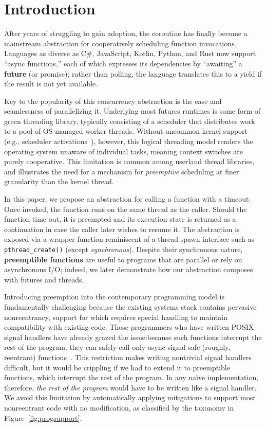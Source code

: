 \section{Introduction}
\label{sec:intro}

After years of struggling to gain adoption, the coroutine has finally become a
mainstream abstraction for cooperatively scheduling function invocations.  Languages
as diverse as C\#, JavaScript, Kotlin, Python, and Rust now support ``async
functions,'' each of which expresses its dependencies by ``awaiting'' a
\textbf{future} (or promise); rather than polling, the language translates this to a
yield if the result is not yet available.

Key to the popularity of this concurrency abstraction is the ease and seamlessness of
parallelizing it.  Underlying most futures runtimes is some form of green threading
library, typically consisting of a scheduler that distributes work to a pool of
OS-managed worker threads.  Without uncommon kernel
support (e.g., scheduler activations~\cite{anderson:sosp1991}), however, this logical
threading model renders the operating system unaware of individual tasks, meaning
context switches are purely cooperative.  This limitation is common among userland
thread libraries, and illustrates the need for a mechanism for \textit{preemptive}
scheduling at finer granularity than the kernel thread.

In this paper, we propose an abstraction for calling a function with a timeout:  Once
invoked, the function runs on the same thread as the caller.  Should the function
time out, it is preempted and its execution state is returned as a continuation in
case the caller later wishes to resume it.  The abstraction is exposed via a wrapper
function reminiscent of a thread spawn interface such as \texttt{pthread\_create()}
(except \textit{synchronous}).  Despite their synchronous nature, \textbf{preemptible
functions} are useful to programs that are parallel or rely on asynchronous I/O;
indeed, we later demonstrate how our abstraction composes with futures and threads.

Introducing preemption into the contemporary programming model is fundamentally
challenging because the existing systems stack contains pervasive nonreentrancy,
support for which requires special handling to maintain compatibility with existing
code.  Those programmers who have written POSIX signal handlers have already grazed
the issue:\@ because such functions interrupt the rest of the program, they can
safely call only async-signal-safe (roughly, reentrant)
functions~\cite{signal-safety-manpage}.  This restriction makes writing nontrivial
signal handlers difficult, but it would be crippling if we had to extend it to
preemptible functions, which interrupt the rest of the program.  In any na\"ive
implementation, therefore, \textit{the rest of the program} would have to be written
like a signal handler.  We avoid this limitation by automatically applying
mitigations to support most nonreentrant code with no modification, as classified by
the taxonomy in Figure~\ref{fig:progsupport}.

